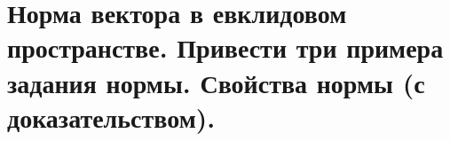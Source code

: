 \section{
    Норма вектора в евклидовом пространстве. Привести три примера задания нормы. Свойства нормы (с доказательством).
}




